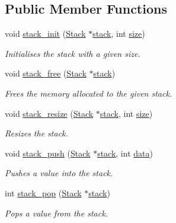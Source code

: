 \subsection*{Public Member Functions}
\begin{DoxyCompactItemize}
\item 
void \hyperlink{structstack_aebdb418b70e964383b7b0e2fbedde09e}{stack\+\_\+init} (\hyperlink{structstack_aa7883e8bf747b9dedec990b539df2cc0}{Stack} $\ast$\hyperlink{structstack}{stack}, int \hyperlink{structstack_a439227feff9d7f55384e8780cfc2eb82}{size})
\begin{DoxyCompactList}\small\item\em Initialises the stack with a given size. \end{DoxyCompactList}\item 
void \hyperlink{structstack_afc04d6c48f275815a5a248a37b9f30bc}{stack\+\_\+free} (\hyperlink{structstack_aa7883e8bf747b9dedec990b539df2cc0}{Stack} $\ast$\hyperlink{structstack}{stack})
\begin{DoxyCompactList}\small\item\em Frees the memory allocated to the given stack. \end{DoxyCompactList}\item 
void \hyperlink{structstack_ac04939a837a201ef916b8df6886d939a}{stack\+\_\+resize} (\hyperlink{structstack_aa7883e8bf747b9dedec990b539df2cc0}{Stack} $\ast$\hyperlink{structstack}{stack}, int \hyperlink{structstack_a439227feff9d7f55384e8780cfc2eb82}{size})
\begin{DoxyCompactList}\small\item\em Resizes the stack. \end{DoxyCompactList}\item 
void \hyperlink{structstack_ae041e1222c96f70d7b1a4528c3b3bf2c}{stack\+\_\+push} (\hyperlink{structstack_aa7883e8bf747b9dedec990b539df2cc0}{Stack} $\ast$\hyperlink{structstack}{stack}, int \hyperlink{structstack_ac103627c1ad15cbec2f22d0abe6d54b6}{data})
\begin{DoxyCompactList}\small\item\em Pushes a value into the stack. \end{DoxyCompactList}\item 
int \hyperlink{structstack_a86914bce7c52639297c92a086ba87581}{stack\+\_\+pop} (\hyperlink{structstack_aa7883e8bf747b9dedec990b539df2cc0}{Stack} $\ast$\hyperlink{structstack}{stack})
\begin{DoxyCompactList}\small\item\em Pops a value from the stack. \end{DoxyCompactList}\item 

\end{DoxyCompactItemize}
